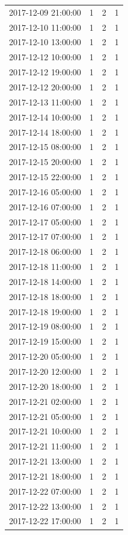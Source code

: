 \begin{tabular}{lrrr}
2017-12-09 21:00:00 & 1 & 2 & 1 \\
2017-12-10 11:00:00 & 1 & 2 & 1 \\
2017-12-10 13:00:00 & 1 & 2 & 1 \\
2017-12-12 10:00:00 & 1 & 2 & 1 \\
2017-12-12 19:00:00 & 1 & 2 & 1 \\
2017-12-12 20:00:00 & 1 & 2 & 1 \\
2017-12-13 11:00:00 & 1 & 2 & 1 \\
2017-12-14 10:00:00 & 1 & 2 & 1 \\
2017-12-14 18:00:00 & 1 & 2 & 1 \\
2017-12-15 08:00:00 & 1 & 2 & 1 \\
2017-12-15 20:00:00 & 1 & 2 & 1 \\
2017-12-15 22:00:00 & 1 & 2 & 1 \\
2017-12-16 05:00:00 & 1 & 2 & 1 \\
2017-12-16 07:00:00 & 1 & 2 & 1 \\
2017-12-17 05:00:00 & 1 & 2 & 1 \\
2017-12-17 07:00:00 & 1 & 2 & 1 \\
2017-12-18 06:00:00 & 1 & 2 & 1 \\
2017-12-18 11:00:00 & 1 & 2 & 1 \\
2017-12-18 14:00:00 & 1 & 2 & 1 \\
2017-12-18 18:00:00 & 1 & 2 & 1 \\
2017-12-18 19:00:00 & 1 & 2 & 1 \\
2017-12-19 08:00:00 & 1 & 2 & 1 \\
2017-12-19 15:00:00 & 1 & 2 & 1 \\
2017-12-20 05:00:00 & 1 & 2 & 1 \\
2017-12-20 12:00:00 & 1 & 2 & 1 \\
2017-12-20 18:00:00 & 1 & 2 & 1 \\
2017-12-21 02:00:00 & 1 & 2 & 1 \\
2017-12-21 05:00:00 & 1 & 2 & 1 \\
2017-12-21 10:00:00 & 1 & 2 & 1 \\
2017-12-21 11:00:00 & 1 & 2 & 1 \\
2017-12-21 13:00:00 & 1 & 2 & 1 \\
2017-12-21 18:00:00 & 1 & 2 & 1 \\
2017-12-22 07:00:00 & 1 & 2 & 1 \\
2017-12-22 13:00:00 & 1 & 2 & 1 \\
2017-12-22 17:00:00 & 1 & 2 & 1 \\

\end{tabular}
